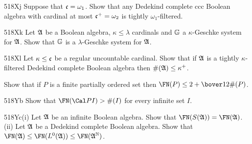 {\spheader 518Xj Suppose that $\frak c=\omega_1$.   Show
that any Dedekind complete ccc Boolean algebra with cardinal at most
$\frak c^+=\omega_2$ is tightly $\omega_1$-filtered.

\spheader 518Xk
Let $\frak A$ be a Boolean algebra, $\kappa\le\lambda$ cardinals and
$\Bbb G$ a $\kappa$-Geschke system for $\frak A$.   Show that
$\Bbb G$ is a $\lambda$-Geschke system for $\frak A$.

\spheader 518Xl Let $\kappa\le\frak c$ be a regular uncountable
cardinal.   Show that if $\frak A$ is a tightly $\kappa$-filtered
Dedekind complete Boolean algebra then $\#(\frak A)\le\kappa^+$.

Show that if $P$ is a finite partially ordered set then
$\FN(P)\le 2+\bover12\#(P)$.

\spheader 518Yb Show that $\FN(\Cal PI)>\#(I)$ for every infinite
set $I$.

\spheader 518Yc(i) Let $\frak A$ be an infinite Boolean algebra.   Show
that $\FN(S(\frak A))=\FN(\frak A)$.
(ii) Let $\frak A$ be a
Dedekind complete Boolean algebra.   Show that
$\FN(\frak A)\le\FN(L^0(\frak A))\le\FN(\frak A^{\Bbb N})$.
}%

